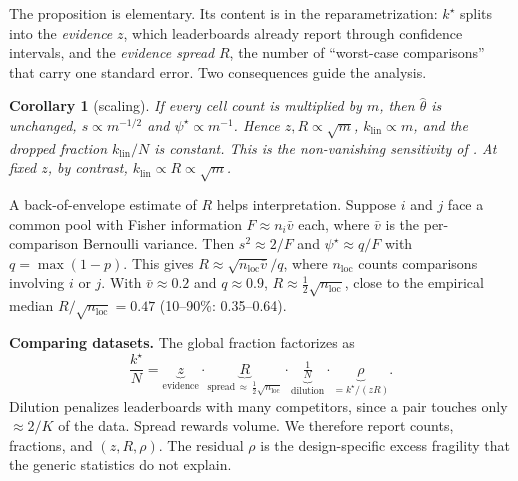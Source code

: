 \documentclass{article}
\newtheorem{corollary}{Corollary}
\newcommand{\kstar}{k^\star}
\begin{document}
The proposition is elementary. Its content is in the reparametrization: $\kstar$ splits into the \emph{evidence} $z$, which leaderboards already report through confidence intervals, and the \emph{evidence spread} $R$, the number of ``worst-case comparisons'' that carry one standard error. Two consequences guide the analysis.
\begin{corollary}[scaling]\label{cor:scale}
If every cell count is multiplied by $m$, then $\hat\theta$ is unchanged, $s\propto m^{-1/2}$ and $\psi^\star\propto m^{-1}$. Hence $z,R\propto\sqrt m$, $k_{\mathrm{lin}}\propto m$, and the dropped fraction $k_{\mathrm{lin}}/N$ is constant. This is the non-vanishing sensitivity of \citet{broderick2020automatic}. At fixed $z$, by contrast, $k_{\mathrm{lin}}\propto R\propto\sqrt{m}$.
\end{corollary}
A back-of-envelope estimate of $R$ helps interpretation. Suppose $i$ and $j$ face a common pool with Fisher information $F\approx n_i\bar v$ each, where $\bar v$ is the per-comparison Bernoulli variance. Then $s^2\approx 2/F$ and $\psi^\star\approx q/F$ with $q=\max(1-p)$. This gives $R\approx\sqrt{n_{\mathrm{loc}}\bar v}/q$, where $n_{\mathrm{loc}}$ counts comparisons involving $i$ or $j$. With $\bar v\approx0.2$ and $q\approx0.9$, $R\approx\tfrac12\sqrt{n_{\mathrm{loc}}}$, close to the empirical median $R/\sqrt{n_{\mathrm{loc}}}=0.47$ (10--90\%: 0.35--0.64).

\textbf{Comparing datasets.} The global fraction factorizes as
\begin{equation}\label{eq:decomp}
\frac{\kstar}{N} = \underbrace{z}_{\text{evidence}}\cdot\underbrace{R}_{\text{spread}\,\approx\,\frac12\sqrt{n_{\mathrm{loc}}}}\cdot\underbrace{\tfrac1N}_{\text{dilution}}\cdot\underbrace{\rho}_{=\kstar/(zR)}.
\end{equation}
Dilution penalizes leaderboards with many competitors, since a pair touches only $\approx 2/K$ of the data. Spread rewards volume. We therefore report counts, fractions, and $(z,R,\rho)$. The residual $\rho$ is the design-specific excess fragility that the generic statistics do not explain.
\end{document}
